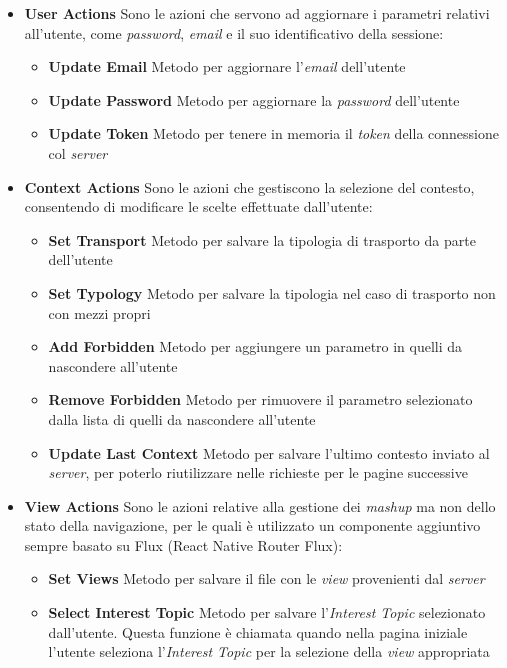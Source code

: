 \begin{itemize}
	\item \textbf{User Actions}
	Sono le azioni che servono ad aggiornare i parametri relativi all'utente, come \emph{password}, \emph{email} e il suo identificativo della sessione:
	\begin{itemize}
		\item \textbf{Update Email}
		Metodo per aggiornare l'\emph{email} dell'utente 
		\item \textbf{Update Password}
		Metodo per aggiornare la \emph{password} dell'utente
		\item \textbf{Update Token}
		Metodo per tenere in memoria il \emph{token} della connessione col \emph{server}
	\end{itemize}
	\item \textbf{Context Actions}
	Sono le azioni che gestiscono la selezione del contesto, consentendo di modificare le scelte effettuate dall'utente:
	\begin{itemize}
		\item \textbf{Set Transport}
		Metodo per salvare la tipologia di trasporto da parte dell'utente
		\item \textbf{Set Typology}
		Metodo per salvare la tipologia nel caso di trasporto non con mezzi propri
		\item \textbf{Add Forbidden}
		Metodo per aggiungere un parametro in quelli da nascondere all'utente
		\item \textbf{Remove Forbidden}
		Metodo per rimuovere il parametro selezionato dalla lista di quelli da nascondere all'utente
		\item \textbf{Update Last Context}
		Metodo per salvare l'ultimo contesto inviato al \emph{server}, per poterlo riutilizzare nelle richieste per le pagine successive
	\end{itemize}
	\item \textbf{View Actions}
	Sono le azioni relative alla gestione dei \emph{mashup} ma non dello stato della navigazione, per le quali è utilizzato un componente aggiuntivo sempre basato su Flux (React Native Router Flux):
	\begin{itemize}
		\item \textbf{Set Views}
		Metodo per salvare il file con le \emph{view} provenienti dal \emph{server} 
		\item \textbf{Select Interest Topic}
		Metodo per salvare l'\emph{Interest Topic} selezionato dall'utente. Questa funzione è chiamata quando nella pagina iniziale l'utente seleziona l'\emph{Interest Topic} per la selezione della \emph{view} appropriata
	\end{itemize}
	

\end{itemize}
